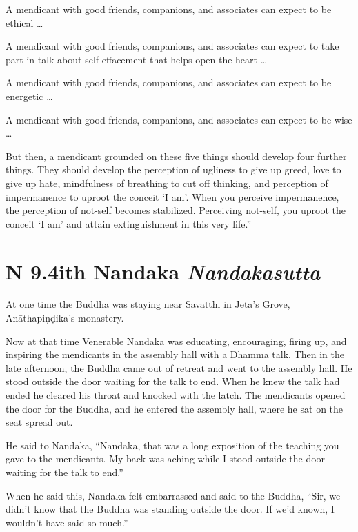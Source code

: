 \documentclass[12pt,openany]{book}%
\newcommand*{\suttatitleacronym}[1]{\smaller[2]{#1}\vspace*{.3em}}
\newcommand*{\suttatitletranslation}[1]{\linebreak{#1}}
\newcommand*{\suttatitleroot}[1]{\linebreak\smaller[2]\itshape{#1}}
\newcommand*{\tocacronym}[1]{\hspace*{-3.3em}{#1}\quad}
\newcommand*{\toctranslation}[1]{#1}
\newcommand*{\tocroot}[1]{(\textit{#1})}
\begin{document}
A mendicant with good friends, companions, and associates can expect to be ethical … 

A mendicant with good friends, companions, and associates can expect to take part in talk about self-effacement that helps open the heart … 

A mendicant with good friends, companions, and associates can expect to be energetic … 

A mendicant with good friends, companions, and associates can expect to be wise … 

But then, a mendicant grounded on these five things should develop four further things. They should develop the perception of ugliness to give up greed, love to give up hate, mindfulness of breathing to cut off thinking, and perception of impermanence to uproot the conceit ‘I am’. When you perceive impermanence, the perception of not-self becomes stabilized. Perceiving not-self, you uproot the conceit ‘I am’ and attain extinguishment in this very life.” 

%
\section*{{\suttatitleacronym AN 9.4}{\suttatitletranslation With Nandaka }{\suttatitleroot Nandakasutta}}
\addcontentsline{toc}{section}{\tocacronym{AN 9.4} \toctranslation{With Nandaka } \tocroot{Nandakasutta}}

At one time the Buddha was staying near \textsanskrit{Sāvatthī} in Jeta’s Grove, \textsanskrit{Anāthapiṇḍika}’s monastery. 

Now at that time Venerable Nandaka was educating, encouraging, firing up, and inspiring the mendicants in the assembly hall with a Dhamma talk. Then in the late afternoon, the Buddha came out of retreat and went to the assembly hall. He stood outside the door waiting for the talk to end. When he knew the talk had ended he cleared his throat and knocked with the latch. The mendicants opened the door for the Buddha, and he entered the assembly hall, where he sat on the seat spread out. 

He said to Nandaka, “Nandaka, that was a long exposition of the teaching you gave to the mendicants. My back was aching while I stood outside the door waiting for the talk to end.” 

When he said this, Nandaka felt embarrassed and said to the Buddha, “Sir, we didn’t know that the Buddha was standing outside the door. If we’d known, I wouldn’t have said so much.” 
\end{document}
